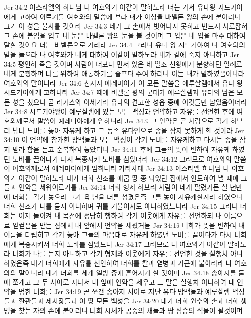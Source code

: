 Jer 34:2  이스라엘의 하나님 나 여호와가 이같이 말하노라 너는 가서 유다왕 시드기야에게 고하여 이르기를 여호와의 말씀에 보라 내가 이성을 바벨론 왕의 손에 붙이리니 그가 이 성을 불사를 것이라
Jer 34:3  네가 그 손에서 벗어나지 못하고 반드시 사로잡혀 그 손에 붙임을 입고 네 눈은 바벨론 왕의 눈을 볼 것이며 그 입은 네 입을 마주 대하여 말할 것이요 너는 바벨론으로 가리라
Jer 34:4  그러나 유다 왕 시드기야여 나 여호와의 말을 들으라 나 여호와가 네게 대하여 이같이 말하노라 네가 칼에 죽지 아니하고
Jer 34:5  평안히 죽을 것이며 사람이 너보다 먼저 있은 네 열조 선왕에게 분향하던 일례로 네게 분향하며 너를 위하여 애통하기를 슬프다 주여 하리니 이는 내가 말하였음이니라 여호와의 말이니라
Jer 34:6  선지자 예레미야가 이 모든 말씀을 예루살렘에서 유다 왕 시드기야에게 고하니라
Jer 34:7  때에 바벨론 왕의 군대가 예루살렘과 유다의 남은 모든 성을 쳤으니 곧 라기스와 아세가라 유다의 견고한 성읍 중에 이것들만 남았음이더라
Jer 34:8  시드기야왕이 예루살렘에 있는 모든 백성과 언약하고 자유를 선언한 후에 여호와께로서 말씀이 예레미야에게 임하니라
Jer 34:9  그 언약은 곧 사람으로 각기 히브리 남녀 노비를 놓아 자유케 하고 그 동족 유다인으로 종을 삼지 못하게 한 것이라
Jer 34:10  이 언약에 참가한 방백들과 모든 백성이 각기 노비를 자유케하고 다시는 종을 삼지 말라 함을 듣고 순복하여 놓았더니
Jer 34:11  후에 그들의 뜻이 변하여 자유케 하였던 노비를 끌어다가 다시 복종시켜 노비를 삼았더라
Jer 34:12  그러므로 여호와의 말씀이 여호와께로서 예레미야에게 임하니라 가라사대
Jer 34:13  이스라엘 하나님 나 여호와가 이같이 말하노라 내가 너희 선조를 애굽 땅 종 되었던 집에서 인도하여 낼 때에 그들과 언약을 세워이르기를
Jer 34:14  너희 형제 히브리 사람이 네게 팔렸거든 칠 년만에 너희는 각기 놓으라 그가 육 년을 너를 섬겼은즉 그를 놓아 자유케할지라 하였으나 너희 선조가 나를 듣지 아니하며 귀를 기울이지도 아니하였느니라
Jer 34:15  그러나 너희는 이제 돌이켜 내 목전에 정당히 행하여 각기 이웃에게 자유를 선언하되 내 이름으로 일컬음을 받는 집에서 내 앞에서 언약을 세웠거늘
Jer 34:16  너희가 뜻을 변하여 내 이름을 더럽히고 각기 놓아 그들의 마음대로 자유케 하였던 노비를 끌어다가 다시 너희에게 복종시켜서 너희 노비를 삼았도다
Jer 34:17  그러므로 나 여호와가 이같이 말하노라 너희가 나를 듣지 아니하고 각기 형제와 이웃에게 자유를 선언한 것을 실행치 아니하였은즉 내가 너희에게 자유를 선언하여 너희를 칼과 염병과 기근에 붙이리라 나 여호와의 말이니라 내가 너희를 세계 열방 중에 흩어지게 할 것이며
Jer 34:18  송아지를 둘에 쪼개고 그 두 사이로 지나서 내 앞에 언약을 세우고 그 말을 실행치 아니하여 내 언약을 범한 너희를
Jer 34:19  곧 쪼갠 송아지 사이로 지난 유다 방백들과 예루살렘 백성들과 환관들과 제사장들과 이 땅 모든 백성을
Jer 34:20  내가 너희 원수의 손과 너희 생명을 찾는 자의 손에 붙이리니 너희 시체가 공중의 새들과 땅 짐승의 식물이 될것이며
